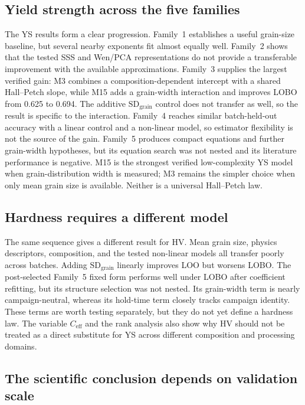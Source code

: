 \documentclass[5p,times,twocolumn]{elsarticle}
\begin{document}
\subsection{Yield strength across the five families}

The YS results form a clear progression. Family~1 establishes a useful grain-size baseline, but several nearby exponents fit almost equally well. Family~2 shows that the tested SSS and Wen/PCA representations do not provide a transferable improvement with the available approximations. Family~3 supplies the largest verified gain: M3 combines a composition-dependent intercept with a shared Hall--Petch slope, while M15 adds a grain-width interaction and improves LOBO from 0.625 to 0.694. The additive $\mathrm{SD}_{\mathrm{grain}}$ control does not transfer as well, so the result is specific to the interaction. Family~4 reaches similar batch-held-out accuracy with a linear control and a non-linear model, so estimator flexibility is not the source of the gain. Family~5 produces compact equations and further grain-width hypotheses, but its equation search was not nested and its literature performance is negative. M15 is the strongest verified low-complexity YS model when grain-distribution width is measured; M3 remains the simpler choice when only mean grain size is available. Neither is a universal Hall--Petch law.

\subsection{Hardness requires a different model}

The same sequence gives a different result for HV. Mean grain size, physics descriptors, composition, and the tested non-linear models all transfer poorly across batches. Adding $\mathrm{SD}_{\mathrm{grain}}$ linearly improves LOO but worsens LOBO. The post-selected Family~5 fixed form performs well under LOBO after coefficient refitting, but its structure selection was not nested. Its grain-width term is nearly campaign-neutral, whereas its hold-time term closely tracks campaign identity. These terms are worth testing separately, but they do not yet define a hardness law. The variable $C_{\mathrm{eff}}$ and the rank analysis also show why HV should not be treated as a direct substitute for YS across different composition and processing domains.

\subsection{The scientific conclusion depends on validation scale}
\end{document}
